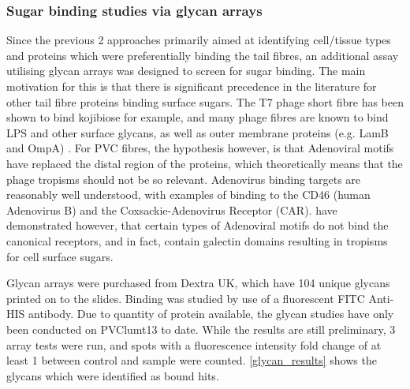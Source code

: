 \subsubsection{Sugar binding studies via glycan arrays}
Since the previous 2 approaches primarily aimed at identifying cell/tissue types and proteins which were preferentially binding the tail fibres, an additional assay utilising glycan arrays was designed to screen for sugar binding. The main motivation for this is that there is significant precedence in the literature for other tail fibre proteins binding surface sugars. The T7 phage short fibre has been shown to bind kojibiose for example, and many phage fibres are known to bind LPS and other surface glycans, \citep{Simpson2015, Le2013} as well as outer membrane proteins (e.g. LamB and OmpA) \citep{Chatterjee2012, Morona1984}. For PVC fibres, the hypothesis however, is that Adenoviral motifs have replaced the distal region of the proteins, which theoretically means that the phage tropisms should not be so relevant. Adenovirus binding targets are reasonably well understood, with examples of binding to the CD46 (human Adenovirus B) \citep{Gaggar2003} and the Coxsackie-Adenovirus Receptor (CAR). \cite{Guardado-Calvo2010} have demonstrated however, that certain types of Adenoviral motifs do not bind the canonical receptors, and in fact, contain galectin domains resulting in tropisms for cell surface sugars.

Glycan arrays were purchased from Dextra UK, which have 104 unique glycans printed on to the slides. Binding was studied by use of a fluorescent FITC Anti-HIS antibody. Due to quantity of protein available, the glycan studies have only been conducted on PVClumt13 to date. While the results are still preliminary, 3 array tests were run, and spots with a fluorescence intensity fold change of at least 1 between control and sample were counted. \vref{glycan_results} shows the glycans which were identified as bound hits.
\clearpage

